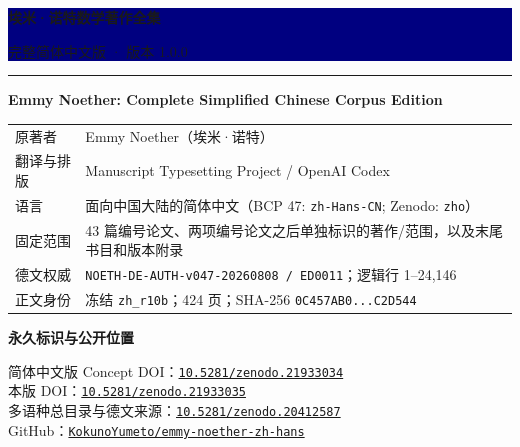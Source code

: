 \documentclass[11pt]{article}
\begin{document}
\thispagestyle{empty}

\colorbox{navy}{%
  \parbox[c][3.0cm][c]{\dimexpr\textwidth-2\fboxsep\relax}{%
    \color{white}\sffamily\bfseries\fontsize{22}{28}\selectfont
    埃米·诺特数学著作全集\par
    \vspace{0.35em}\fontsize{13}{18}\selectfont 完整简体中文版 · 版本 1.0.0
  }%
}
\color{gold}\rule{\textwidth}{5pt}

\vspace{1.2cm}
{\sffamily\bfseries\color{navy}\fontsize{15}{20}\selectfont
Emmy Noether: Complete Simplified Chinese Corpus Edition}\par

\vspace{0.7cm}
\color{ink}
\begin{tabular}{@{}p{3.3cm}p{11.4cm}@{}}
原著者 & Emmy Noether（埃米·诺特）\\[0.28em]
翻译与排版 & Manuscript Typesetting Project / OpenAI Codex\\[0.28em]
语言 & 面向中国大陆的简体中文（BCP 47: \texttt{zh-Hans-CN}; Zenodo: \texttt{zho}）\\[0.28em]
固定范围 & 43 篇编号论文、两项编号论文之后单独标识的著作/范围，以及末尾书目和版本附录\\[0.28em]
德文权威 & \texttt{NOETH-DE-AUTH-v047-20260808 / ED0011}；逻辑行 1--24,146\\[0.28em]
正文身份 & 冻结 \texttt{zh\_r10b}；424 页；SHA-256 \texttt{0C457AB0...C2D544}\\
\end{tabular}

\vspace{0.8cm}
\colorbox{pale}{%
  \parbox{\dimexpr\textwidth-2\fboxsep\relax}{%
    \vspace{0.35em}
    {\sffamily\bfseries\color{navy}永久标识与公开位置}\par\vspace{0.4em}
    简体中文版 Concept DOI：\href{https://doi.org/10.5281/zenodo.21933034}{\texttt{10.5281/zenodo.21933034}}\\[0.22em]
    本版 DOI：\href{https://doi.org/10.5281/zenodo.21933035}{\texttt{10.5281/zenodo.21933035}}\\[0.22em]
    多语种总目录与德文来源：\href{https://doi.org/10.5281/zenodo.20412587}{\texttt{10.5281/zenodo.20412587}}\\[0.22em]
    GitHub：\href{https://github.com/KokunoYumeto/emmy-noether-zh-hans}{\texttt{KokunoYumeto/emmy-noether-zh-hans}}
    \vspace{0.35em}
  }%
}
\end{document}
